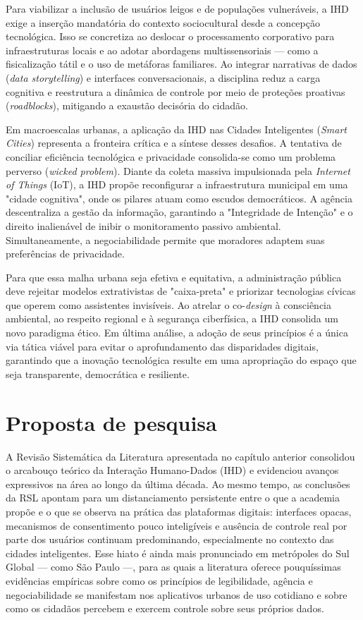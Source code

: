 \documentclass[
	12pt,				%
	oneside,			%
	a4paper,			%
	english,			%
	brazil				%
	]{abntex2ppgsi}
\begin{document}
    Para viabilizar a inclusão de usuários leigos e de populações vulneráveis, a IHD exige a inserção mandatória do contexto sociocultural desde a concepção tecnológica. Isso se concretiza ao deslocar o processamento corporativo para infraestruturas locais e ao adotar abordagens multissensoriais — como a fisicalização tátil e o uso de metáforas familiares. Ao integrar narrativas de dados (\textit{data storytelling}) e interfaces conversacionais, a disciplina reduz a carga cognitiva e reestrutura a dinâmica de controle por meio de proteções proativas (\textit{roadblocks}), mitigando a exaustão decisória do cidadão.

    Em macroescalas urbanas, a aplicação da IHD nas Cidades Inteligentes (\textit{Smart Cities}) representa a fronteira crítica e a síntese desses desafios. A tentativa de conciliar eficiência tecnológica e privacidade consolida-se como um problema perverso (\textit{wicked problem}). Diante da coleta massiva impulsionada pela \textit{Internet of Things} (IoT), a IHD propõe reconfigurar a infraestrutura municipal em uma "cidade cognitiva", onde os pilares atuam como escudos democráticos. A agência descentraliza a gestão da informação, garantindo a "Integridade de Intenção" e o direito inalienável de inibir o monitoramento passivo ambiental. Simultaneamente, a negociabilidade permite que moradores adaptem suas preferências de privacidade.

    Para que essa malha urbana seja efetiva e equitativa, a administração pública deve rejeitar modelos extrativistas de "caixa-preta" e priorizar tecnologias cívicas que operem como assistentes invisíveis. Ao atrelar o co-\textit{design} à consciência ambiental, ao respeito regional e à segurança ciberfísica, a IHD consolida um novo paradigma ético. Em última análise, a adoção de seus princípios é a única via tática viável para evitar o aprofundamento das disparidades digitais, garantindo que a inovação tecnológica resulte em uma apropriação do espaço que seja transparente, democrática e resiliente.
    
\chapter{Proposta de pesquisa}

    A Revisão Sistemática da Literatura apresentada no capítulo anterior consolidou o arcabouço teórico da Interação Humano-Dados (IHD) e evidenciou avanços expressivos na área ao longo da última década. Ao mesmo tempo, as conclusões da RSL apontam para um distanciamento persistente entre o que a academia propõe e o que se observa na prática das plataformas digitais: interfaces opacas, mecanismos de consentimento pouco inteligíveis e ausência de controle real por parte dos usuários continuam predominando, especialmente no contexto das cidades inteligentes. Esse hiato é ainda mais pronunciado em metrópoles do Sul Global — como São Paulo —, para as quais a literatura oferece pouquíssimas evidências empíricas sobre como os princípios de legibilidade, agência e negociabilidade se manifestam nos aplicativos urbanos de uso cotidiano e sobre como os cidadãos percebem e exercem controle sobre seus próprios dados.
    
\end{document}
